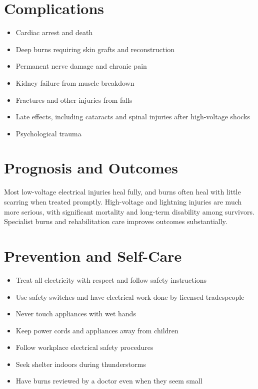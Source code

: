 \section*{Complications}
\begin{itemize}
    \item Cardiac arrest and death
    \item Deep burns requiring skin grafts and reconstruction
    \item Permanent nerve damage and chronic pain
    \item Kidney failure from muscle breakdown
    \item Fractures and other injuries from falls
    \item Late effects, including cataracts and spinal injuries after high-voltage shocks
    \item Psychological trauma
\end{itemize}

\section*{Prognosis and Outcomes}
Most low-voltage electrical injuries heal fully, and burns often heal with little scarring when treated promptly. High-voltage and lightning injuries are much more serious, with significant mortality and long-term disability among survivors. Specialist burns and rehabilitation care improves outcomes substantially.

\section*{Prevention and Self-Care}
\begin{itemize}
    \item Treat all electricity with respect and follow safety instructions
    \item Use safety switches and have electrical work done by licensed tradespeople
    \item Never touch appliances with wet hands
    \item Keep power cords and appliances away from children
    \item Follow workplace electrical safety procedures
    \item Seek shelter indoors during thunderstorms
    \item Have burns reviewed by a doctor even when they seem small
\end{itemize}

